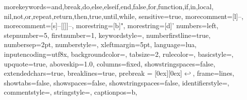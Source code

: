 \usepackage{listings}
\usepackage{textcomp}
  {morekeywords={and,break,do,else,elseif,end,false,for,function,if,in,local,
     nil,not,or,repeat,return,then,true,until,while},
     sensitive=true,
   morecomment=[l]{--},
   morecomment=[s]{--[[}{]]--},
   morestring=[b]",
   morestring=[d]'
  }
{
	numbers=left,
	stepnumber=5,    
	firstnumber=1,
	keywordstyle=\color{blue},
	numberfirstline=true,
	numbersep=2pt, %
	numberstyle=\tiny\color{gray}, %
	xleftmargin=5pt,%
	language=lua,
	inputencoding=utf8x,
	backgroundcolor=\color[rgb]{0.95,0.95,0.95},
	tabsize=2,
	rulecolor=,
	basicstyle=\footnotesize \ttfamily,
	upquote=true,
	aboveskip={1.0\baselineskip},
	columns=fixed,
	showstringspaces=false,
	extendedchars=true,
	breaklines=true,
	prebreak = \raisebox{0ex}[0ex][0ex]{\ensuremath{\hookleftarrow}},
	frame=lines,
	showtabs=false,
	showspaces=false,
	showstringspaces=false,
	identifierstyle=\ttfamily,
	commentstyle=\color[rgb]{0.133,0.545,0.133},
	stringstyle=\color[rgb]{0.627,0.126,0.941},
	captionpos=b,
}  



  
%
%

